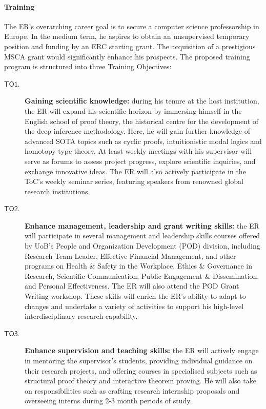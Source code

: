 \documentclass[11pt]{msca-pf}
\newcommand{\TO}[1]{$\mathsf{TO#1}$}
\begin{document}
\paragraph{Training}
The ER's overarching career goal is to secure a computer science professorship in Europe. In the
medium term, he aspires to obtain an unsupervised temporary position and funding by an ERC starting
grant. The acquisition of a prestigious MSCA grant would significantly enhance his prospects. The
proposed training program is structured into three Training Objectives:
\begin{description}
    \item[\TO{1}.] \textbf{Gaining scientific knowledge:}
    during his tenure at the host institution, the ER will expand his scientific horizon by
    immersing himself in the English school of proof theory, the historical centre for the
    development of the deep inference methodology. Here, he will gain further knowledge of advanced
    SOTA topics such as cyclic proofs, intuitionistic modal logics and homotopy type
    theory. At least weekly meetings with his supervisor will serve as forums to assess project
    progress, explore scientific inquiries, and exchange innovative ideas. The ER will also actively
    participate in the ToC's weekly seminar series, featuring speakers from renowned global research
    institutions.

    \item[\TO{2}.] \textbf{Enhance management, leadership and grant writing skills:}
    the ER will participate in several management and leadership skills courses offered by UoB's
    People and Organization Development (POD) division, including Research Team Leader, Effective
    Financial Management, and other programs on Health \& Safety in the Workplace, Ethics \&
    Governance in Research, Scientific Communication, Public Engagement \& Dissemination, and
    Personal Effectiveness. The ER will also attend the POD Grant Writing workshop. These skills
    will enrich the ER's ability to adapt to changes and undertake a variety of activities to
    support his high-level interdisciplinary research capability.

    \item[\TO{3}.] \textbf{Enhance supervision and teaching skills:}
    the ER will actively engage in mentoring the supervisor's students, providing individual
    guidance on their research projects, and offering courses in specialised subjects such as
    structural proof theory and interactive theorem proving. He will also take on responsibilities
    such as crafting research internship proposals and overseeing interns during 2-3 month periods
    of study.

\end{description}
\end{document}
